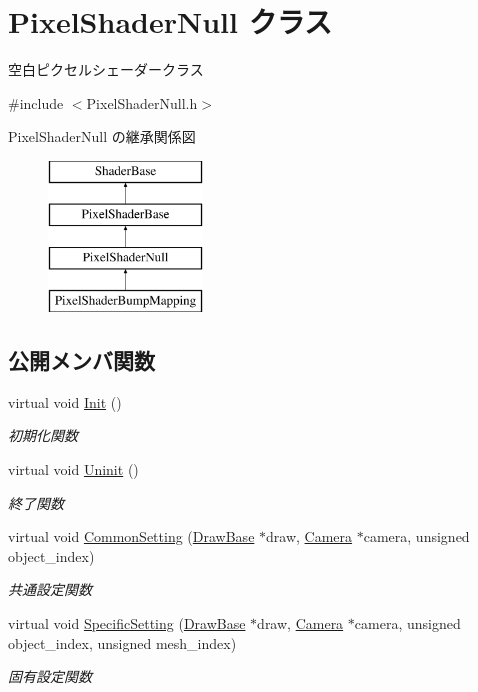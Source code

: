 \hypertarget{class_pixel_shader_null}{}\section{Pixel\+Shader\+Null クラス}
\label{class_pixel_shader_null}


空白ピクセルシェーダークラス  




{\ttfamily \#include $<$Pixel\+Shader\+Null.\+h$>$}

Pixel\+Shader\+Null の継承関係図\begin{figure}[H]
\begin{center}
\leavevmode
\includegraphics[height=4.000000cm]{class_pixel_shader_null}
\end{center}
\end{figure}
\subsection*{公開メンバ関数}
\begin{DoxyCompactItemize}
\item 
virtual void \mbox{\hyperlink{class_pixel_shader_null_abfd7a6a986da09061a55d31024219eba}{Init}} ()
\begin{DoxyCompactList}\small\item\em 初期化関数 \end{DoxyCompactList}\item 
virtual void \mbox{\hyperlink{class_pixel_shader_null_ae5ee2fa95e5da787918ccbd1877cd0ef}{Uninit}} ()
\begin{DoxyCompactList}\small\item\em 終了関数 \end{DoxyCompactList}\item 
virtual void \mbox{\hyperlink{class_pixel_shader_null_a99c712ab174da29ba26a893820b64799}{Common\+Setting}} (\mbox{\hyperlink{class_draw_base}{Draw\+Base}} $\ast$draw, \mbox{\hyperlink{class_camera}{Camera}} $\ast$camera, unsigned object\+\_\+index)
\begin{DoxyCompactList}\small\item\em 共通設定関数 \end{DoxyCompactList}\item 
virtual void \mbox{\hyperlink{class_pixel_shader_null_a8dd0194b5a22da5261ab35233a7cfdcd}{Specific\+Setting}} (\mbox{\hyperlink{class_draw_base}{Draw\+Base}} $\ast$draw, \mbox{\hyperlink{class_camera}{Camera}} $\ast$camera, unsigned object\+\_\+index, unsigned mesh\+\_\+index)
\begin{DoxyCompactList}\small\item\em 固有設定関数 \end{DoxyCompactList}\end{DoxyCompactItemize}


